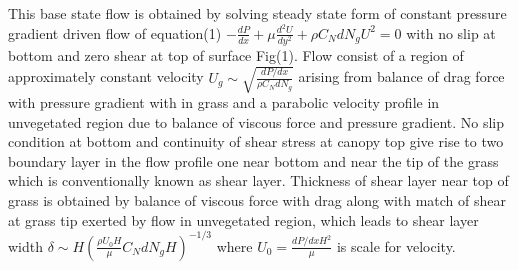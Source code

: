 \documentclass[aps,twocolumn,floatfix,prl,10pt]{revtex4-1}
\begin{document}
This base state flow is obtained by solving steady state form of constant pressure gradient driven flow of equation(1)
$-\frac{dP}{dx}+\mu\frac{d^2U}{dy^2}+\rho C_N d N_gU^2=0$ with no slip at bottom and zero shear at top of surface Fig(1). Flow consist of a region of approximately constant velocity
$U_g \sim \sqrt{\frac{dP/dx}{\rho C_N dN_g}}$ arising from balance of drag force with pressure gradient with in grass and a parabolic velocity profile in unvegetated region due to 
balance of viscous force and pressure gradient. No slip condition at bottom and continuity of shear stress at canopy top give rise to two boundary layer in the flow profile one 
near bottom and near the tip of the grass which is conventionally known as shear layer.
Thickness of shear layer near top of grass is obtained by balance of viscous force 
with drag along with match of shear at grass tip exerted by flow in unvegetated region, which leads to shear layer 
width $\delta \sim  H\left(\frac{\rho U_0 H}{\mu} C_N d N_g H\right)^{-1/3}$ where $U_0 = \frac{dP/dxH^2}{\mu}$ is scale for velocity.
 
\end{document}
